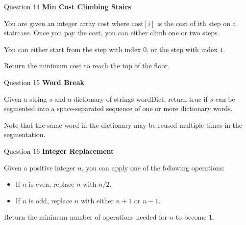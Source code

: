 \documentclass{beamer}
\begin{document}
\begin{frame}{}
\end{frame}
\begin{frame}{}
\end{frame}

\begin{frame}{Question 14}
\textbf{Min Cost Climbing Stairs}

You are given an integer array cost where $\text{cost}[i]$ is the cost of ith step on a staircase. Once you pay the cost, you can either climb one or two steps.

You can either start from the step with index $0$, or the step with index $1$.

Return the minimum cost to reach the top of the floor.
\end{frame}

\begin{frame}{}
\end{frame}
\begin{frame}{}
\end{frame}

\begin{frame}{Question 15}
\textbf{Word Break}

Given a string $s$ and a dictionary of strings $\text{wordDict}$, return true if $s$ can be segmented into a space-separated sequence of one or more dictionary words.

Note that the same word in the dictionary may be reused multiple times in the segmentation.
\end{frame}

\begin{frame}{}
\end{frame}
\begin{frame}{}
\end{frame}

\begin{frame}{Question 16}
\textbf{Integer Replacement}

Given a positive integer $n$, you can apply one of the following operations:
\begin{itemize}
  \item If $n$ is even, replace $n$ with $n / 2$.
  \item If $n$ is odd, replace $n$ with either $n + 1$ or $n - 1$.
\end{itemize}

Return the minimum number of operations needed for $n$ to become $1$.
\end{frame}
\end{document}
